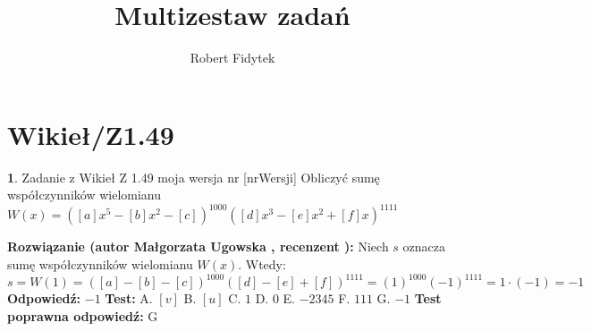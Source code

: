 \documentclass[12pt, a4paper]{article}
\title{Multizestaw zadań}
\author{Robert Fidytek}
\date{}
\theoremstyle{definition} %
\newtheorem{zad}{}
\newcommand{\kategoria}[1]{\section{#1}} %
\newcommand{\zadStart}[1]{\begin{zad}#1\newline} %
\newcommand{\zadStop}{\end{zad}}   %
\newcommand{\rozwStart}[2]{\noindent \textbf{Rozwiązanie (autor #1 , recenzent #2): }\newline} %
\newcommand{\rozwStop}{\newline}                                            %
\newcommand{\odpStart}{\noindent \textbf{Odpowiedź:}\newline}    %
\newcommand{\odpStop}{\newline}                                             %
\newcommand{\testStart}{\noindent \textbf{Test:}\newline} %
\newcommand{\testStop}{\newline} %
\newcommand{\kluczStart}{\noindent \textbf{Test poprawna odpowiedź:}\newline} %
\newcommand{\kluczStop}{\newline} %
\begin{document}
\maketitle


\kategoria{Wikieł/Z1.49}
\zadStart{Zadanie z Wikieł Z 1.49 moja wersja nr [nrWersji]}
Obliczyć sumę współczynników wielomianu $W(x)=([a]x^5-[b]x^2-[c])^{1000}([d]x^3-[e]x^2+[f]x)^{1111}$
\zadStop
\rozwStart{Małgorzata Ugowska}{}
Niech $s$ oznacza sumę współczynników wielomianu $W(x)$. Wtedy:
$$s =W(1) = ([a]-[b]-[c])^{1000}([d]-[e]+[f])^{1111} = (1)^{1000}(-1)^{1111} = 1 \cdot (-1) = -1$$
\rozwStop
\odpStart
$-1$
\odpStop
\testStart
A. $[v]$
B. $[u]$
C. $1$
D. $0$
E. $-2345$
F. $111$
G. $-1$
\testStop
\kluczStart
G
\kluczStop
\end{document}
